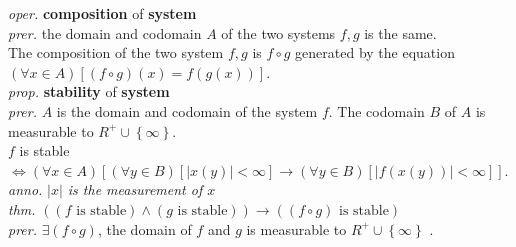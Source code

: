 \documentclass[16pt]{article}
\newcommand{\sd}[1]{{\left(#1\right)}}
\newcommand{\thm}[1]{\emph{thm.} #1}
\newcommand{\anno}[1]{\emph{anno.} \emph{#1}}
\newcommand{\md}[1]{{\left[#1\right]}}
\newcommand{\ld}[1]{{\left\{#1\right\}}}
\newcommand{\prer}[1]{\emph{prer.} #1}
\newcommand{\oper}[2]{\emph{oper.} \textbf{#1} of \textbf{#2}}
\newcommand{\prop}[2]{\emph{prop.} \textbf{#1} of \textbf{#2}}
\newcommand{\abs}[1]{{\left|#1\right|}}
\begin{document}
\oper{composition}{system}\\
\prer{the domain and codomain $A$ of the two systems $f,g$ is the same.}\\
The composition of the two system $f,g$ is $f\circ g$ generated by the equation $\sd{\forall x \in A}\md{\sd{f\circ g}\sd{x} = f\sd{g\sd{x}}}$.\\
\prop{stability}{system}\\
\prer{$A$ is the domain and codomain of the system $f$. The codomain $B$ of $A$ is measurable to $R^{+}\cup\ld{\infty}$.}\\
$f$ is stable $\iff \sd{\forall x \in A}\md{\sd{\forall y \in B}\md{\abs{x\sd{y}} < \infty} \to \sd{\forall y \in B}\md{\abs{f\sd{x\sd{y}}} < \infty}}$.\\
\anno{$\abs{x}$ is the measurement of $x$}\\
\thm{$\sd{\sd{f\text{ is stable}}\land\sd{g\text{ is stable}}} \to \sd{\sd{f \circ g}\text{ is stable}}$}\\
\prer{$\exists\sd{f \circ g}$, the domain of $f$ and $g$ is measurable to $R^{+}\cup\ld{\infty}$ .}\\
\end{document}
